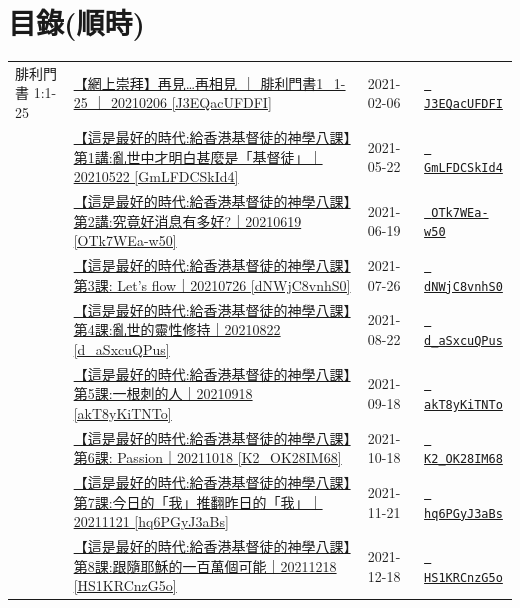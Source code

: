 \documentclass{book}
\begin{document}
\section{目錄\small{(順時)}}
\label{sec:index_chronic}
{ \scriptsize


\begin{xltabular}{\textwidth}{|p{0.15\textwidth} p{0.6\textwidth}|p{0.07\textwidth} p{0.1\textwidth}|}
\hline
腓利門書 1:1-25 & \hyperref[sec:J3EQacUFDFI]{【網上崇拜】再見…再相見 ｜ 腓利門書1\_1-25 ｜ 20210206 [J3EQacUFDFI]} & 2021-02-06 & \href{https://youtube.com/watch?v=J3EQacUFDFI}{\texttt{ J3EQacUFDFI}} \\
    & \hyperref[sec:GmLFDCSkId4]{【這是最好的時代:給香港基督徒的神學八課】第1講:亂世中才明白甚麼是「基督徒」｜20210522 [GmLFDCSkId4]} & 2021-05-22 & \href{https://youtube.com/watch?v=GmLFDCSkId4}{\texttt{ GmLFDCSkId4}} \\
    & \hyperref[sec:OTk7WEa_w50]{【這是最好的時代:給香港基督徒的神學八課】第2講:究竟好消息有多好?｜20210619 [OTk7WEa-w50]} & 2021-06-19 & \href{https://youtube.com/watch?v=OTk7WEa-w50}{\texttt{ OTk7WEa-w50}} \\
    & \hyperref[sec:dNWjC8vnhS0]{【這是最好的時代:給香港基督徒的神學八課】第3課: Let’s flow｜20210726 [dNWjC8vnhS0]} & 2021-07-26 & \href{https://youtube.com/watch?v=dNWjC8vnhS0}{\texttt{ dNWjC8vnhS0}} \\
    & \hyperref[sec:d_aSxcuQPus]{【這是最好的時代:給香港基督徒的神學八課】第4課:亂世的靈性修持｜20210822 [d\_aSxcuQPus]} & 2021-08-22 & \href{https://youtube.com/watch?v=d_aSxcuQPus}{\texttt{ d\_aSxcuQPus}} \\
    & \hyperref[sec:akT8yKiTNTo]{【這是最好的時代:給香港基督徒的神學八課】第5課:一根刺的人｜20210918 [akT8yKiTNTo]} & 2021-09-18 & \href{https://youtube.com/watch?v=akT8yKiTNTo}{\texttt{ akT8yKiTNTo}} \\
    & \hyperref[sec:K2_OK28IM68]{【這是最好的時代:給香港基督徒的神學八課】第6課: Passion｜20211018 [K2\_OK28IM68]} & 2021-10-18 & \href{https://youtube.com/watch?v=K2_OK28IM68}{\texttt{ K2\_OK28IM68}} \\
    & \hyperref[sec:hq6PGyJ3aBs]{【這是最好的時代:給香港基督徒的神學八課】第7課:今日的「我」推翻昨日的「我」｜20211121 [hq6PGyJ3aBs]} & 2021-11-21 & \href{https://youtube.com/watch?v=hq6PGyJ3aBs}{\texttt{ hq6PGyJ3aBs}} \\
    & \hyperref[sec:HS1KRCnzG5o]{【這是最好的時代:給香港基督徒的神學八課】第8課:跟隨耶穌的一百萬個可能｜20211218 [HS1KRCnzG5o]} & 2021-12-18 & \href{https://youtube.com/watch?v=HS1KRCnzG5o}{\texttt{ HS1KRCnzG5o}} \\

\end{xltabular}}
\end{document}
